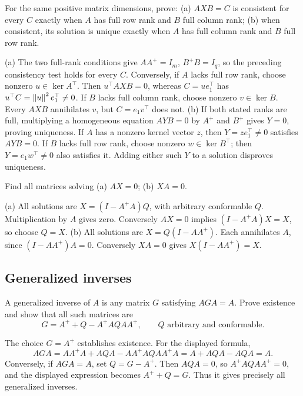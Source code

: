 \begin{problem}\label{ex:10:matrix-uniqueness}
For the same positive matrix dimensions, prove:
(a) \(AXB=C\) is consistent for every \(C\) exactly when \(A\) has
full row rank and \(B\) full column rank;
(b) when consistent, its solution is unique exactly when \(A\) has
full column rank and \(B\) full row rank.
\end{problem}
\begin{solution}
(a) The two full-rank conditions give \(AA^+=I_m\), \(B^+B=I_q\),
so the preceding consistency test holds for every \(C\).
Conversely, if \(A\) lacks full row rank, choose nonzero \(u\in\ker A^\top\).
Then \(u^\top AXB=0\), whereas \(C=ue_1^\top\) has
\(u^\top C=\left\lVert u\right\rVert^2e_1^\top\ne0\). If \(B\) lacks full column rank,
choose nonzero \(v\in\ker B\). Every \(AXB\) annihilates \(v\), but
\(C=e_1v^\top\) does not.
(b) If both stated ranks are full, multiplying a homogeneous equation
\(AYB=0\) by \(A^+\) and \(B^+\) gives \(Y=0\), proving uniqueness.
If \(A\) has a nonzero kernel vector \(z\), then \(Y=ze_1^\top\ne0\)
satisfies \(AYB=0\). If \(B\) lacks full row rank, choose nonzero
\(w\in\ker B^\top\); then \(Y=e_1w^\top\ne0\) also satisfies it.
Adding either such \(Y\) to a solution disproves uniqueness.
\end{solution}

\begin{problem}\label{ex:10:matrix-homogeneous}
Find all matrices solving (a) \(AX=0\); (b) \(XA=0\).
\end{problem}
\begin{solution}
(a) All solutions are \(X=(I-A^+A)Q\), with arbitrary conformable \(Q\).
Multiplication by \(A\) gives zero. Conversely \(AX=0\) implies
\((I-A^+A)X=X\), so choose \(Q=X\).
(b) All solutions are \(X=Q(I-AA^+)\). Each annihilates \(A\), since
\((I-AA^+)A=0\). Conversely \(XA=0\) gives \(X(I-AA^+)=X\).
\end{solution}

\subsection*{Generalized inverses}

\begin{problem}\label{ex:10:generalized-all}
A generalized inverse of \(A\) is any matrix \(G\) satisfying \(AGA=A\).
Prove existence and show that all such matrices are
\[
G=A^++Q-A^+AQAA^+,\qquad Q\text{ arbitrary and conformable}.
\]
\end{problem}
\begin{solution}
The choice \(G=A^+\) establishes existence. For the displayed formula,
\[
AGA=AA^+A+AQA-AA^+AQAA^+A=A+AQA-AQA=A.
\]
Conversely, if \(AGA=A\), set \(Q=G-A^+\). Then \(AQA=0\), so
\(A^+AQAA^+=0\), and the displayed expression becomes \(A^++Q=G\).
Thus it gives precisely all generalized inverses.
\end{solution}

